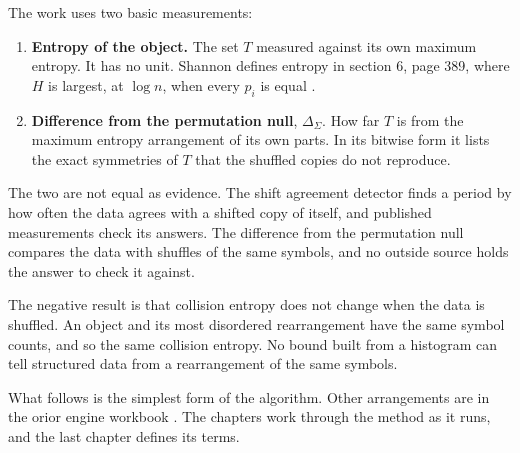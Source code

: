The work uses two basic measurements:

\begin{enumerate}
  \item \textbf{Entropy of the object.} The set \(T\) measured against its own maximum entropy. It
    has no unit. Shannon defines entropy in section 6, page 389, where \(H\) is largest, at
    \(\log n\), when every \(p_i\) is equal \cite{src:Shannon}.
  \item \textbf{Difference from the permutation null}, \(\Delta_{\Sigma}\). How far \(T\) is from the
    maximum entropy arrangement of its own parts. In its bitwise form it lists the exact symmetries
    of \(T\) that the shuffled copies do not reproduce.
\end{enumerate}

The two are not equal as evidence. The shift agreement detector finds a period by how often the data
agrees with a shifted copy of itself, and published measurements check its answers. The difference
from the permutation null compares the data with shuffles of the same symbols, and no outside source
holds the answer to check it against.

The negative result is that collision entropy does not change when the data is shuffled. An object
and its most disordered rearrangement have the same symbol counts, and so the same collision entropy.
No bound built from a histogram can tell structured data from a rearrangement of the same symbols.

What follows is the simplest form of the algorithm. Other arrangements are in the orior engine
workbook \cite{src:Quigg-orior-workbook}. The chapters work through the method as it runs, and the
last chapter defines its terms.
\cleardoublepage
